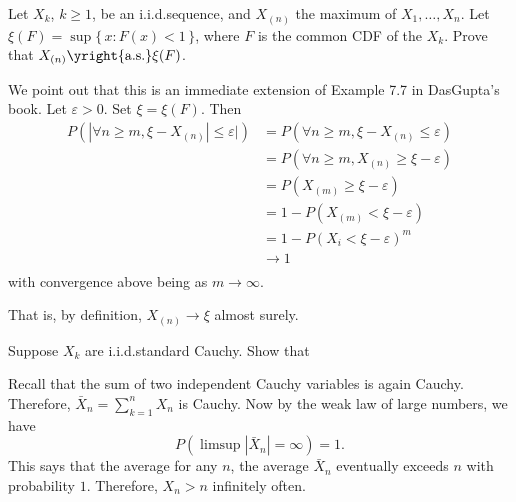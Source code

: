 \begin{problem}
  Let \(X_k\), \(k\geq 1\), be an i.i.d.\@ sequence, and \(X_{(n)}\) the
  maximum of \(X_1,\dotsc,X_n\). Let \(\xi(F)=\sup\{\,x:F(x)<1\,\}\), where
  \(F\) is the common CDF of the \(X_k\). Prove that
  \(X_{(n)}\yright{\text{a.s.}}\xi(F)\).
\end{problem}
\begin{solution}
  We point out that this is an immediate extension of Example 7.7 in
  DasGupta's book. Let $\varepsilon >0$. Set $\xi = \xi(F)$. Then
  \begin{align*}
    P(|\forall n \geq m, \xi - X_{(n)}| \leq \varepsilon|)
    &= P(\forall n \geq m, \xi - X_{(n)} \leq \varepsilon)\\
    &= P(\forall n \geq m, X_{(n)} \geq \xi - \varepsilon )\\
    &= P(X_{(m)} \geq \xi - \varepsilon )\\
    &= 1- P(X_{(m)} < \xi - \varepsilon )\\
    &= 1- P(X_i < \xi - \varepsilon)^m\\
    &\to 1\\
  \end{align*}
  with convergence above being as $m \to \infty$.

  That is, by definition, $X_{(n)} \to \xi$ almost surely.
\end{solution}
\newpage

\begin{problem}[DasGupta 7.14 (a)]
  Suppose \(X_k\) are i.i.d.\@ standard Cauchy. Show that
\end{problem}
\begin{solution}
  Recall that the sum of two independent Cauchy variables is again
  Cauchy. Therefore, \(\bar X_n=\sum_{k=1}^n X_n\) is Cauchy. Now by the
  weak law of large numbers, we have
  \[
    P(\limsup|\bar X_n|=\infty)=1.
  \]
  This says that the average for any \(n\), the average \(\bar X_n\)
  eventually exceeds \(n\) with probability \(1\). Therefore, \(X_n>n\)
  infinitely often.
\end{solution}
\newpage

